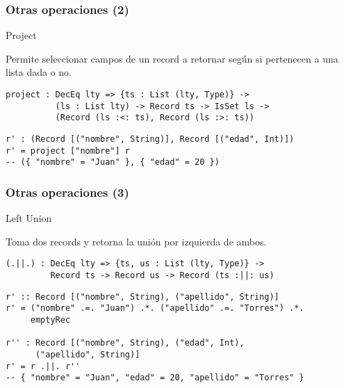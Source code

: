 \documentclass{beamer}
\begin{document}
\begin{frame}[fragile]
\frametitle{Otras operaciones (2)}

\begin{block}{Project}

Permite seleccionar campos de un record a retornar según si pertenecen a una lista dada o no.

\begin{definition}
\begin{verbatim}
project : DecEq lty => {ts : List (lty, Type)} -> 
          (ls : List lty) -> Record ts -> IsSet ls -> 
          (Record (ls :<: ts), Record (ls :>: ts))
\end{verbatim}
\end{definition}

\begin{example}
\begin{verbatim}
r' : (Record [("nombre", String)], Record [("edad", Int)])
r' = project ["nombre"] r
-- ({ "nombre" = "Juan" }, { "edad" = 20 })
\end{verbatim}
\end{example}

\end{block}
\end{frame}

\begin{frame}[fragile]
\frametitle{Otras operaciones (3)}

\begin{block}{Left Union}

Toma dos records y retorna la unión por izquierda de ambos.

\begin{definition}
\begin{verbatim}
(.||.) : DecEq lty => {ts, us : List (lty, Type)} -> 
         Record ts -> Record us -> Record (ts :||: us)
\end{verbatim}
\end{definition}

\begin{example}
\begin{verbatim}
r' :: Record [("nombre", String), ("apellido", String)]
r' = ("nombre" .=. "Juan") .*. ("apellido" .=. "Torres") .*. 
     emptyRec

r'' : Record [("nombre", String), ("edad", Int), 
      ("apellido", String)]
r' = r .||. r''
-- { "nombre" = "Juan", "edad" = 20, "apellido" = "Torres" }
\end{verbatim}
\end{example}

\end{block}
\end{frame}
\end{document}
